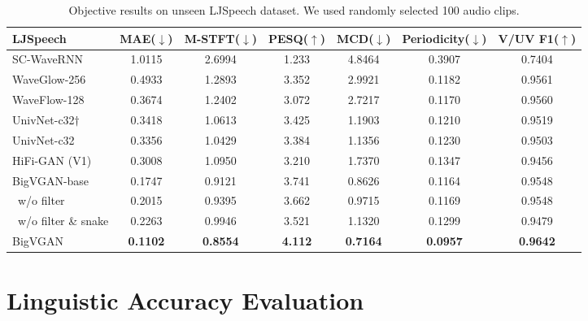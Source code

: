 \documentclass{article} \usepackage{iclr2023_conference,times}
\theoremstyle{plain}
\theoremstyle{definition}
\theoremstyle{remark}
\begin{document}
\begin{table*}[t]
\caption{\footnotesize
Objective results on unseen LJSpeech dataset. We used randomly selected 100 audio clips. 
}
\label{ljspeech}
\vspace{-0.05cm}
\begin{center}
\begin{small}
\begin{adjustbox}{width=0.9\textwidth}
\begin{tabular}{l|cccccc}
\toprule
LJSpeech  & MAE($\downarrow$) & M-STFT($\downarrow$) & PESQ($\uparrow$) & MCD($\downarrow$) & Periodicity($\downarrow$) & V/UV F1($\uparrow$)\\
\midrule
SC-WaveRNN & 1.0115 & 2.6994 & 1.233 & 4.8464 & 0.3907 & 0.7404 \\
WaveGlow-256 & 0.4933 & 1.2893 & 3.352 & 2.9921 & 0.1182 & 0.9561 \\
WaveFlow-128 & 0.3674 & 1.2402 & 3.072 & 2.7217 & 0.1170 & 0.9560 \\
UnivNet-c32$\dagger$ & 0.3418 & 1.0613 & 3.425 & 1.1903 & 0.1210 & 0.9519 \\
UnivNet-c32 & 0.3356 & 1.0429 & 3.384 & 1.1356 & 0.1230 & 0.9503 \\
HiFi-GAN (V1)   & 0.3008 & 1.0950 & 3.210 & 1.7370 & 0.1347 & 0.9456  \\
\midrule
BigVGAN-base    & 0.1747 & 0.9121 & 3.741 & 0.8626 & 0.1164 & 0.9548 \\
\ w/o filter    & 0.2015 & 0.9395 & 3.662 & 0.9715 & 0.1169 & 0.9548 \\
\ w/o filter \& snake    & 0.2263 & 0.9946 & 3.521 & 1.1320 & 0.1299 & 0.9479 \\
\midrule
BigVGAN    & \textbf{0.1102} & \textbf{0.8554} & \textbf{4.112} & \textbf{0.7164} & \textbf{0.0957} & \textbf{0.9642} \\
\bottomrule
\end{tabular}
\end{adjustbox}
\end{small}
\end{center}
\vskip -0.1in
\end{table*}


\clearpage
\newpage

\section{Linguistic Accuracy Evaluation}
\label{appendix:asr}
\end{document}
